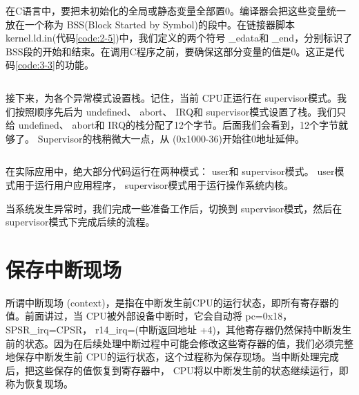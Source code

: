 \documentclass[main.tex]{subfiles}
\begin{document}
\begin{CJK*}{UTF8}{song}
\begin{code}
\label{code:3-2}
\inputminted[firstline=106,lastline=112,linenos,numbersep=5pt,frame=lines,framesep=2mm]{gas}{src/chapter03/kernel/entry.S}
\end{code}

在C语言中，要把未初始化的全局或静态变量全部置0。编译器会把这些变量统一放在一个称为 BSS(Block Started by Symbol)的段中。在链接器脚本 kernel.ld.in(代码\ref{code:2-5})中，我们定义的两个符号 \_edata和 \_end，分别标识了 BSS段的开始和结束。在调用C程序之前，要确保这部分变量的值是0。这正是代码\ref{code:3-3}的功能。

\begin{code}
\label{code:3-3}
\inputminted[firstline=114,lastline=123,linenos,numbersep=5pt,frame=lines,framesep=2mm]{gas}{src/chapter03/kernel/entry.S}
\end{code}

接下来，为各个异常模式设置栈。记住，当前 CPU正运行在 supervisor模式。我们按照顺序先后为 undefined、 abort、 IRQ和 supervisor模式设置了栈。我们只给 undefined、 abort和 IRQ的栈分配了12个字节。后面我们会看到，12个字节就够了。 Supervisor的栈稍微大一点，从 (0x1000-36)开始往0地址延伸。
\begin{code}
\label{code:3-4}
\inputminted[firstline=125,lastline=142,linenos,numbersep=5pt,frame=lines,framesep=2mm]{gas}{src/chapter03/kernel/entry.S}
\end{code}

在实际应用中，绝大部分代码运行在两种模式： user和 supervisor模式。 user模式用于运行用户应用程序， supervisor模式用于运行操作系统内核。
\par
当系统发生异常时，我们完成一些准备工作后，切换到 supervisor模式，然后在 supervisor模式下完成后续的流程。

\section{保存中断现场}
所谓中断现场 (context)，是指在中断发生前CPU的运行状态，即所有寄存器的值。前面讲过，当 CPU被外部设备中断时，它会自动将 pc=0x18， SPSR\_\-irq=CPSR， r14\_\-irq=(中断返回地址 +4)，其他寄存器仍然保持中断发生前的状态。因为在后续处理中断过程中可能会修改这些寄存器的值，我们必须完整地保存中断发生前 CPU的运行状态，这个过程称为保存现场。当中断处理完成后，把这些保存的值恢复到寄存器中， CPU将以中断发生前的状态继续运行，即称为恢复现场。


\end{CJK*}
\end{document}
